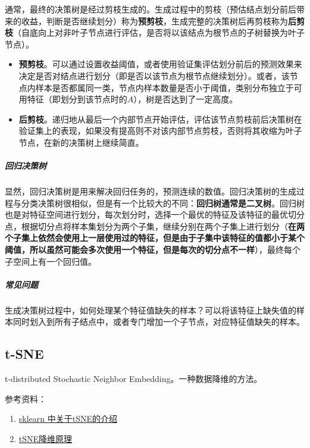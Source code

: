 
通常，最终的决策树是经过剪枝生成的。生成过程中的剪枝（预估结点划分前后带来的收益，判断是否继续划分）称为\textbf{预剪枝}，生成完整的决策树后再剪枝称为\textbf{后剪枝}（自底向上对非叶子节点进行评估，是否将以该结点为根节点的子树替换为叶子节点）。
\begin{itemize}
\item \textbf{预剪枝}。可以通过设置收益阈值，或者使用验证集评估划分前后的预测效果来决定是否对结点进行划分（即是否以该节点为根节点继续划分）。或者，该节点内样本是否都属同一类，节点内样本数量是否小于阈值，类别分布独立于可用特征（即划分到该节点时的$A$），树是否达到了一定高度。
\item \textbf{后剪枝}。递归地从最后一个内部节点开始评估，评估该节点剪枝前后决策树在验证集上的表现，如果没有提高则不对该内部节点剪枝，否则将其收缩为叶子节点，在新的决策树上继续简直。
\end{itemize}

\subparagraph{回归决策树}显然，回归决策树是用来解决回归任务的，预测连续的数值。回归决策树的生成过程与分类决策树很相似，但是有一个比较大的不同：\textbf{回归树通常是二叉树}。回归树也是对特征空间进行划分，每次划分时，选择一个最优的特征及该特征的最优切分点，根据切分点将样本集划分为两个子集，继续分别在两个子集上进行划分（\textbf{在两个子集上依然会使用上一层使用过的特征，但是由于子集中该特征的值都小于某个阈值，所以虽然可能会多次使用一个特征，但是每次的切分点不一样}），最终每个子空间上有一个回归值。

\subparagraph{常见问题}
\begin{myenumerate}
\item 生成决策树过程中，如何处理某个特征值缺失的样本？可以将该特征上缺失值的样本同时划入到所有子结点中，或者专门增加一个子节点，对应特征值缺失的样本。
\item 
\end{myenumerate}


\subsection{t-SNE}
t-distributed Stochastic Neighbor Embedding。一种数据降维的方法。

参考资料：
\begin{enumerate}
	\item \href{https://scikit-learn.org/stable/modules/manifold.html#t-distributed-stochastic-neighbor-embedding-t-sne}{sklearn 中关于tSNE的介绍}
	\item \href{https://www.jianshu.com/p/700f017cd330}{tSNE降维原理}
\end{enumerate}

